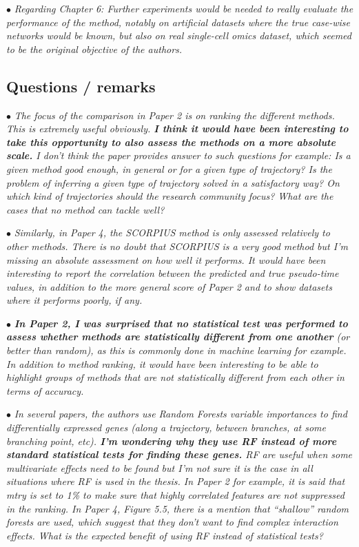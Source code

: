 \documentclass[10pt]{article}
\newcommand{\exam}[2][\  ]{\hspace{0pt}\marginpar{\color{myred}#1}$\bullet$ \textit{#2}}
\newcommand{\imp}[1]{\textbf{#1}}
\newcommand{\bigexclaim}{\raisebox{-0.1em}{\BigTriangleUp}\hspace{-0.32em}\llap{\small\textbf{!}}\hspace{0.32em}}
\newcommand{\tagimp}{\bigexclaim}
\begin{document}
\exam{Regarding Chapter 6: Further experiments
	would be needed to really evaluate the performance of the method, notably on artificial datasets
	where the true case-wise networks would be known, but also on real single-cell omics dataset,
	which seemed to be the original objective of the authors.}

\subsection{Questions / remarks} 

\exam[\tagimp]{The focus of the comparison in Paper 2 is on ranking the different methods. This is extremely
	useful obviously. \imp{I think it would have been interesting to take this opportunity to also assess
	the methods on a more absolute scale.} I don’t think the paper provides answer to such
	questions for example: Is a given method good enough, in general or for a given type of
	trajectory? Is the problem of inferring a given type of trajectory solved in a satisfactory way?
	On which kind of trajectories should the research community focus? What are the cases that
	no method can tackle well?}

\exam{Similarly, in Paper 4, the SCORPIUS method is only assessed relatively to other methods.
	There is no doubt that SCORPIUS is a very good method but I’m missing an absolute
	assessment on how well it performs. It would have been interesting to report the correlation
	between the predicted and true pseudo-time values, in addition to the more general score of
	Paper 2 and to show datasets where it performs poorly, if any.}

\exam[\tagimp]{\imp{In Paper 2, I was surprised that no statistical test was performed to assess whether methods
	are statistically different from one another} (or better than random), as this is commonly done
	in machine learning for example. In addition to method ranking, it would have been
	interesting to be able to highlight groups of methods that are not statistically different from
	each other in terms of accuracy.}

\exam[\tagimp]{In several papers, the authors use Random Forests variable importances to find differentially
	expressed genes (along a trajectory, between branches, at some branching point, etc). \imp{I’m
	wondering why they use RF instead of more standard statistical tests for finding these genes.}
	RF are useful when some multivariate effects need to be found but I’m not sure it is the case
	in all situations where RF is used in the thesis. In Paper 2 for example, it is said that mtry is
	set to 1\% to make sure that highly correlated features are not suppressed in the ranking. In
	Paper 4, Figure 5.5, there is a mention that “shallow” random forests are used, which suggest
	that they don’t want to find complex interaction effects. What is the expected benefit of
	using RF instead of statistical tests?}
\end{document}
